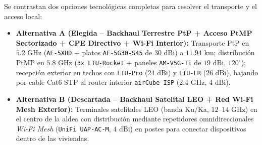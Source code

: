 \documentclass[10pt,letterpaper]{article}
\begin{document}
Se contrastan dos opciones tecnológicas completas para resolver el transporte y el acceso local:
\begin{itemize}
    \item \textbf{Alternativa A (Elegida -- Backhaul Terrestre PtP + Acceso PtMP Sectorizado + CPE Directivo + Wi-Fi Interior):} Transporte PtP en $5.2\text{ GHz}$ (\texttt{AF-5XHD} + platos \texttt{AF-5G30-S45} de $30\text{ dBi}$) a $11.94\text{ km}$; distribución PtMP en $5.8\text{ GHz}$ (\texttt{3x LTU-Rocket} + paneles \texttt{AM-V5G-Ti} de $19\text{ dBi}$, $120^\circ$); recepción exterior en techos con \texttt{LTU-Pro} ($24\text{ dBi}$) y \texttt{LTU-LR} ($26\text{ dBi}$), bajando por cable Cat6 STP al router interior \texttt{airCube ISP} ($2.4\text{ GHz}$, $4\text{ dBi}$).
    \item \textbf{Alternativa B (Descartada -- Backhaul Satelital LEO + Red Wi-Fi Mesh Exterior):} Terminales satelitales LEO (banda Ku/Ka, $12\text{--}14\text{ GHz}$) en el centro de la aldea con distribución mediante repetidores omnidireccionales \textit{Wi-Fi Mesh} (\texttt{UniFi UAP-AC-M}, $4\text{ dBi}$) en postes para conectar dispositivos dentro de las viviendas.
\end{itemize}
\end{document}
